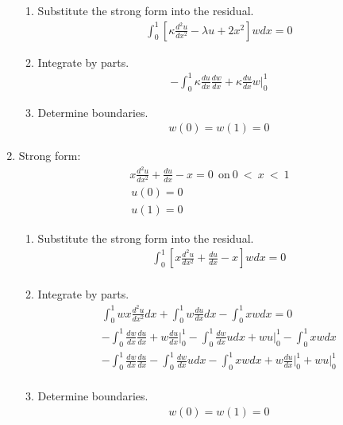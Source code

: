 \documentclass{article}[12pt]%
\begin{document}
\begin{enumerate}
    \begin{enumerate}
        \item Substitute the strong form into the residual. 
        \begin{align*}
            \int^1_0\left[\kappa \frac{d^2 u}{dx^2} - \lambda u + 2x^2\right]wdx = 0  
        \end{align*}
        \item Integrate by parts. 
        \begin{align*}
            -\int^1_0\kappa\frac{du}{dx}\frac{dw}{dx} + \kappa\frac{du}{dx}w\Big|^1_0
        \end{align*}
        \item Determine boundaries.
        \begin{align*}
            w(0) = w(1) = 0
        \end{align*}
    \end{enumerate}


    \item Strong form:
    \begin{align*}
         x \frac{d^2 u}{dx^2} + \frac{du}{dx}  - x = 0~~\mathrm{on}~\mathrm{0} ~<~ x ~ < ~ \mathrm{1}\\
        \frac{}{}u(0) = 0\\
        \frac{}{}u(1) = 0
    \end{align*}

    \begin{enumerate}
        \item Substitute the strong form into the residual. 
        \begin{align*}
            \int^1_0\left[x \frac{d^2 u}{dx^2} + \frac{du}{dx}  - x\right]wdx = 0\\
        \end{align*}
        \item Integrate by parts. 
        \begin{align*}
            \int^1_0wx\frac{d^2 u}{dx^2}dx + \int^1_0w\frac{du}{dx}dx  - \int^1_0xwdx = 0\\
            -\int^1_0\frac{dw}{dx}\frac{du}{dx} + w\frac{du}{dx}\Big|^1_0 - \int^1_0\frac{dw}{dx}udx + wu\Big|^1_0 - \int^1_0xwdx \\
            -\int^1_0\frac{dw}{dx}\frac{du}{dx} - \int^1_0\frac{dw}{dx}udx  - \int^1_0xwdx + w\frac{du}{dx}\Big|^1_0 + wu\Big|^1_0\\
        \end{align*}
        \item Determine boundaries.
        \begin{align*}
            w(0) = w(1) = 0
        \end{align*}
    \end{enumerate}
\end{enumerate}
\end{document}
